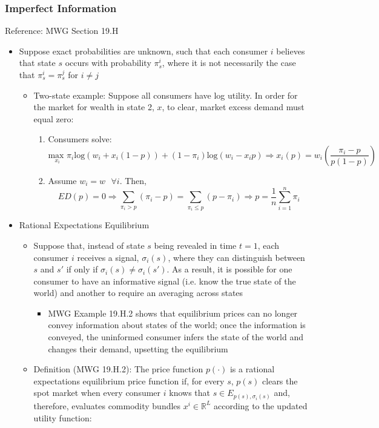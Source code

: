 \documentclass{article}
\newcommand{\R}{\mathbb{R}}
\newcommand{\usmax}[1]{\underset{#1}{\text{max }}}
\newcommand{\loge}[1]{\text{log}\left(#1\right)}
\newcommand{\red}[1]{{\color{red}#1}}
\newcommand{\blue}[1]{{\color{blue}#1}}
\newcommand{\sumn}{\sum_{i=1}^n}
\begin{document}
\subsubsection{Imperfect Information}
\red{Reference: MWG Section 19.H}
\begin{itemize}
	\item Suppose exact probabilities are unknown, such that each consumer $i$ believes that state $s$ occurs with probability $\pi_s^i$, where it is not necessarily the case that ${\pi_s^i=\pi_s^j}$ for ${i\neq j}$
		\begin{itemize}
			\item Two-state example: Suppose all consumers have log utility. In order for the market for wealth in state 2, $x$, to clear, market excess demand must equal zero:
				\begin{enumerate}
					\item Consumers solve:
						\[
							\usmax{x_i}\pi_i\loge{w_i + x_i(1-p)} + (1-\pi_i)\loge{w_i-x_ip}\Rightarrow x_i(p) = w_i\left(\frac{\pi_i-p}{p(1-p)}\right)
						\]
					\item Assume $w_i=w\text{ }\forall i$. Then,
						\[
							ED(p) =0\Rightarrow \sum_{\pi_i>p}(\pi_i-p)=\sum_{\pi_i\leq p}(p-\pi_i)\Rightarrow p=\frac{1}{n}\sumn\pi_i
						\]
				\end{enumerate}
		\end{itemize}
	\item \blue{Rational Expectations Equilibrium}
		\begin{itemize}
			\item Suppose that, instead of state $s$ being revealed in time $t=1$, each consumer $i$ receives a signal, $\sigma_i(s)$, where they can distinguish between $s$ and $s'$ if only if ${\sigma_i(s)\neq\sigma_i(s')}$. As a result, it is possible for one consumer to have an informative signal (i.e. know the true state of the world) and another to require an averaging across states
				\begin{itemize}
					\item \red{MWG Example 19.H.2 shows that equilibrium prices can no longer convey information about states of the world; once the information is conveyed, the uninformed consumer infers the state of the world and changes their demand, upsetting the equilibrium}
				\end{itemize}
			\item \blue{Definition} (\red{MWG 19.H.2}): The price function $p(\cdot)$ is a rational expectations equilibrium price function if, for every $s$, $p(s)$ clears the spot market when every consumer $i$ knows that ${s\in E_{p(s),\sigma_i(s)}}$ and, therefore, evaluates commodity bundles ${x^i\in\R^L}$ according to the updated utility function:

\end{itemize}
\end{itemize}
\end{document}
